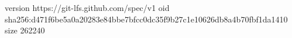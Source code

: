 version https://git-lfs.github.com/spec/v1
oid sha256:d471f6be5a0a20283e84bbe7bfcc0dc35f9b27c1e10626db8a4b70fbf1da1410
size 262240
